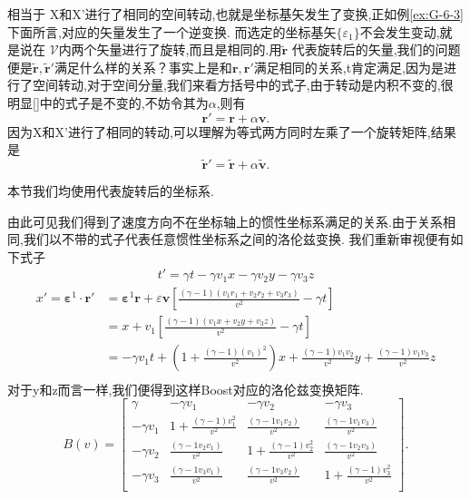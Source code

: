 \documentclass[../main.tex]{subfiles}
\begin{document}
相当于 X和X’进行了相同的空间转动,也就是坐标基矢发生了变换,正如例\ref{ex:G-6-3}下面所言,对应的矢量发生了一个逆变换.
而选定的坐标基矢$\{\varepsilon_1\}$不会发生变动,就是说在 $\mathscr{V}$内两个矢量进行了旋转,而且是相同的.用$\tilde{\bm{r}}$
代表旋转后的矢量,我们的问题便是$\tilde{\bm{r}},\tilde{\bm{r}}'$满足什么样的关系？事实上是和$\bm{r},\bm{r}'$满足相同的关系,t肯定满足,因为是进行了空间转动,对于空间分量,我们来看方括号中的式子,由于转动是内积不变的,很明显[]中的式子是不变的,不妨令其为$\alpha$,则有 \[
	\bm{r}' = \bm{r}+\alpha\bm{v}
	.\] 因为X和X'进行了相同的转动,可以理解为等式两方同时左乘了一个旋转矩阵,结果是\[
	\tilde{\bm{r}}'= \tilde{\bm{r}} + \alpha \tilde{\bm{v}}
	.\]
\begin{note}
	本节我们均使用$\tilde{ }$代表旋转后的坐标系.
\end{note}
由此可见我们得到了速度方向不在坐标轴上的惯性坐标系满足的关系.由于关系相同,我们以不带$\tilde{ }$的式子代表任意惯性坐标系之间的洛伦兹变换.
我们重新审视便有如下式子
\begin{align*}
	t' = \gamma t - \gamma v_1 x - \gamma v_2 y - \gamma v_3 z
\end{align*}
\begin{align*}
	x' =  \bm{\varepsilon}^1\cdot\bm{r}' & = \bm{\varepsilon}^1 \bm{r} + \varepsilon \bm{v}[\frac{(\gamma-1)(v_1r_1+v_2r_2 +v_3r_3)}{v^2} - \gamma t]               \\
	                                     & = x + v_1[\frac{(\gamma -1)(v_1x+v_2y +v_3z)}{v^2} - \gamma t]                                                           \\
	                                     & = -\gamma v_1 t + (1 + \frac{(\gamma -1)(v_1)^2}{v^2})x + \frac{(\gamma-1)v_1v_2}{v^2}y + \frac{(\gamma -1)v_1v_3}{v^2}z \\
\end{align*}
对于y和z而言一样,我们便得到这样Boost对应的洛伦兹变换矩阵.
\[
	B(v) = \begin{bmatrix}
		\gamma      & -\gamma v_1                     & -\gamma v_2                     & -\gamma v_3                     \\
		-\gamma v_1 & 1+ \frac{(\gamma -1)v_1^2}{v^2} & \frac{(\gamma -1 v_1 v_2)}{v^2} & \frac{(\gamma -1 v_1 v_3)}{v^2} \\
		-\gamma v_2 & \frac{(\gamma -1 v_2 v_1)}{v^2} & 1+\frac{(\gamma -1)v_2^2}{v^2}  & \frac{(\gamma -1 v_2 v_3)}{v^2} \\
		-\gamma v_3 & \frac{(\gamma -1 v_3 v_1)}{v^2} & \frac{(\gamma -1 v_3 v_2)}{v^2} & 1+\frac{(\gamma -1)v_3^2}{v^2}  \\
	\end{bmatrix}
	.\]
\end{document}
